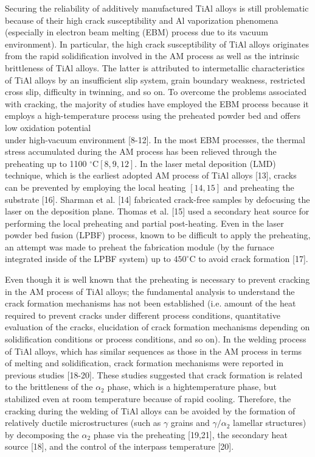 \documentclass[10pt]{article}
\begin{document}
Securing the reliability of additively manufactured TiAl alloys is still problematic because of their high crack susceptibility and $\mathrm{Al}$ vaporization phenomena (especially in electron beam melting (EBM) process due to its vacuum environment). In particular, the high crack susceptibility of $\mathrm{TiAl}$ alloys originates from the rapid solidification involved in the AM process as well as the intrinsic brittleness of TiAl alloys. The latter is attributed to intermetallic characteristics of TiAl alloys by an insufficient slip system, grain boundary weakness, restricted cross slip, difficulty in twinning, and so on. To overcome the problems associated with cracking, the majority of studies have employed the EBM process because it employs a high-temperature process using the preheated powder bed and offers low oxidation potential\\
under high-vacuum environment [8-12]. In the most EBM processes, the thermal stress accumulated during the AM process has been relieved through the preheating up to 1100 ${ }^{\circ} \mathrm{C}[8,9,12]$. In the laser metal deposition (LMD) technique, which is the earliest adopted AM process of TiAl alloys [13], cracks can be prevented by employing the local heating $[14,15]$ and preheating the substrate [16]. Sharman et al. [14] fabricated crack-free samples by defocusing the laser on the deposition plane. Thomas et al. [15] used a secondary heat source for performing the local preheating and partial post-heating. Even in the laser powder bed fusion (LPBF) process, known to be difficult to apply the preheating, an attempt was made to preheat the fabrication module (by the furnace integrated inside of the LPBF system) up to $450^{\circ} \mathrm{C}$ to avoid crack formation [17].

Even though it is well known that the preheating is necessary to prevent cracking in the AM process of TiAl alloys; the fundamental analysis to understand the crack formation mechanisms has not been established (i.e. amount of the heat required to prevent cracks under different process conditions, quantitative evaluation of the cracks, elucidation of crack formation mechanisms depending on solidification conditions or process conditions, and so on). In the welding process of TiAl alloys, which has similar sequences as those in the AM process in terms of melting and solidification, crack formation mechanisms were reported in previous studies [18-20]. These studies suggested that crack formation is related to the brittleness of the $\alpha_{2}$ phase, which is a hightemperature phase, but stabilized even at room temperature because of rapid cooling. Therefore, the cracking during the welding of TiAl alloys can be avoided by the formation of relatively ductile microstructures (such as $\gamma$ grains and $\gamma / \alpha_{2}$ lamellar structures) by decomposing the $\alpha_{2}$ phase via the preheating [19,21], the secondary heat source [18], and the control of the interpass temperature [20].
\end{document}
